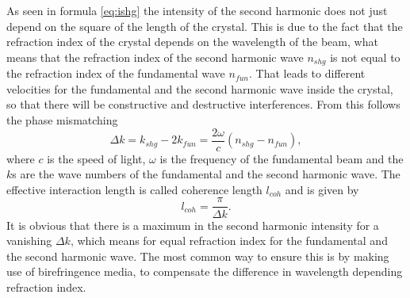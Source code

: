 \documentclass[10pt, a4paper, notitlepage, DIV=15]{scrartcl}
\begin{document}
As seen in formula \ref{eq:ishg} the intensity of the second harmonic does not just depend on the square of the length of the crystal. This is due to the fact that the refraction index of the crystal depends on the wavelength of the beam, what means that the refraction index of the second harmonic wave $n_{shg}$ is not equal to the refraction index of the fundamental wave $n_{fun}$. That leads to different velocities for the fundamental and the second harmonic wave inside the crystal, so that there will be constructive and destructive interferences. From this follows the phase mismatching \cite{meschede}
\begin{equation}
\Delta k = k_{shg}-2k_{fun} = \frac{2\omega}{c}(n_{shg}-n_{fun}),
\end{equation}
where $c$ is the speed of light, $\omega$ is the frequency of the fundamental beam and the $k$s are the wave numbers of the fundamental and the second harmonic wave. The effective interaction length is called coherence length $l_{coh}$ and is given by\cite{meschede}
\begin{equation}
l_{coh}=\frac{\pi}{\Delta k}.
\end{equation}  
\newline It is obvious that there is a maximum in the second harmonic intensity for a vanishing $\Delta k$, which means for equal refraction index for the fundamental and the second harmonic wave. The most common way to ensure this is by making use of birefringence media, to compensate the difference in wavelength depending refraction index. 
\end{document}
